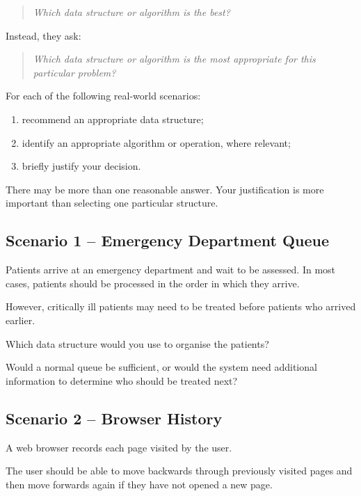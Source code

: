 \documentclass{csc2059practical}
\begin{document}
\begin{quote}
\emph{Which data structure or algorithm is the best?}
\end{quote}

Instead, they ask:

\begin{quote}
\emph{Which data structure or algorithm is the most appropriate for this particular problem?}
\end{quote}

For each of the following real-world scenarios:

\begin{enumerate}
    \item recommend an appropriate data structure;
    \item identify an appropriate algorithm or operation, where relevant;
    \item briefly justify your decision.
\end{enumerate}

There may be more than one reasonable answer. Your justification is more important than selecting one particular structure.

\subsection*{Scenario 1 -- Emergency Department Queue}

Patients arrive at an emergency department and wait to be assessed. In most cases, patients should be processed in the order in which they arrive.

However, critically ill patients may need to be treated before patients who arrived earlier.

\begin{reflectionbox}
Which data structure would you use to organise the patients?

Would a normal queue be sufficient, or would the system need additional information to determine who should be treated next?
\end{reflectionbox}

\subsection*{Scenario 2 -- Browser History}

A web browser records each page visited by the user.

The user should be able to move backwards through previously visited pages and then move forwards again if they have not opened a new page.
\end{document}

